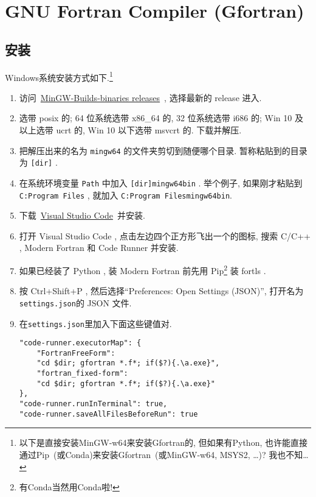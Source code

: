 \section[GNU Fortran Compiler]{GNU Fortran Compiler (Gfortran)}

\subsection{安装}

Windows系统安装方式如下.\footnote{
    以下是直接安装MinGW-w64来安装Gfortran的, 但如果有Python, 也许能直接通过Pip~(或Conda)来安装Gfortran~(或MinGW-w64, MSYS2, \dots)? 我也不知\dots
}
\begin{enumerate}
    \item 访问~\href{https://github.com/niXman/mingw-builds-binaries/releases}
    {MinGW-Builds-binaries releases}~, 选择最新的 release 进入.
    \item 选带 posix 的; 64 位系统选带 x86\_{}64 的, 32 位系统选带 i686 的; Win 10 及以上选带 ucrt 的, Win 10 以下选带 msvcrt 的. 下载并解压.
    \item 把解压出来的名为 \texttt{mingw64} 的文件夹剪切到随便哪个目录. 暂称粘贴到的目录为 \texttt{[dir]} .
    \item 在系统环境变量 \texttt{Path} 中加入 \texttt{[dir]\bs{}mingw64\bs{}bin} . 举个例子, 如果刚才粘贴到 \texttt{C:\bs{}Program Files} , 就加入 \texttt{C:\bs{}Program Files\bs{}mingw64\bs{}bin}.
    \item 下载~\href{https://code.visualstudio.com/sha/download?build=stable&os=win32-x64-user}
    {Visual Studio Code}~并安装.
    \item 打开 Visual Studio Code , 点击左边四个正方形飞出一个的图标, 搜索 C/C++ , Modern Fortran 和 Code Runner 并安装.
    \item[] 如果已经装了 Python , 装 Modern Fortran 前先用 Pip\footnote{有Conda当然用Conda啦!} 装 fortls .
    \item 按 Ctrl+Shift+P , 然后选择``Preferences: Open Settings (JSON)'', 打开名为\texttt{settings.json}的 JSON 文件.
    \item 在\texttt{settings.json}里加入下面这些键值对.\label{add_key_value}
    \begin{verbatim}
"code-runner.executorMap": {
    "FortranFreeForm":
    "cd $dir; gfortran *.f*; if($?){.\a.exe}",
    "fortran_fixed-form":
    "cd $dir; gfortran *.f*; if($?){.\a.exe}"
},
"code-runner.runInTerminal": true,
"code-runner.saveAllFilesBeforeRun": true
    \end{verbatim}
\end{enumerate}
